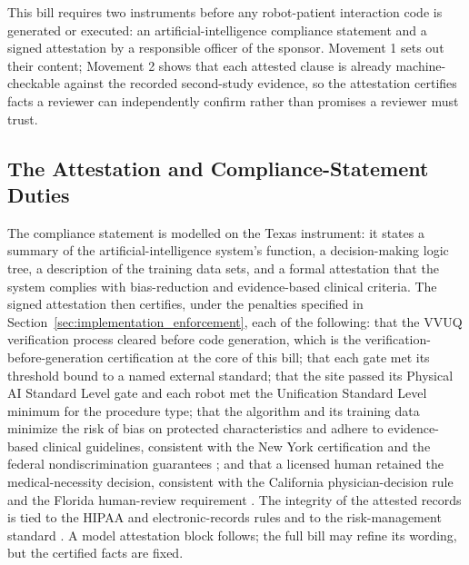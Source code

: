 
This bill requires two instruments before any robot-patient interaction code is
generated or executed: an artificial-intelligence compliance statement and a
signed attestation by a responsible officer of the sponsor. Movement 1 sets out
their content; Movement 2 shows that each attested clause is already
machine-checkable against the recorded second-study evidence, so the attestation
certifies facts a reviewer can independently confirm rather than promises a
reviewer must trust.

\subsection{The Attestation and Compliance-Statement Duties}

The compliance statement is modelled on the Texas instrument: it states a summary
of the artificial-intelligence system's function, a decision-making logic tree, a
description of the training data sets, and a formal attestation that the system
complies with bias-reduction and evidence-based clinical criteria. The signed
attestation then certifies, under the penalties specified in
Section~\ref{sec:implementation_enforcement}, each of the following: that the
VVUQ verification process cleared before code generation, which is the
verification-before-generation certification at the core of this bill; that each
gate met its threshold bound to a named external standard; that the site passed
its Physical AI Standard Level gate and each robot met the Unification Standard
Level minimum for the procedure type; that the algorithm and its training data
minimize the risk of bias on protected characteristics and adhere to
evidence-based clinical guidelines, consistent with the New York certification
\cite{ny-a9149} and the federal nondiscrimination guarantees
\cite{usc-titlevi, usc-ada}; and that a licensed human retained the
medical-necessity decision, consistent with the California physician-decision
rule \cite{ca-sb1120} and the Florida human-review requirement \cite{fl-hb527}.
The integrity of the attested records is tied to the HIPAA and electronic-records
rules \cite{cfr-hipaa, cfr-part11} and to the risk-management standard
\cite{iso14971}. A model attestation block follows; the full bill may refine its
wording, but the certified facts are fixed.


